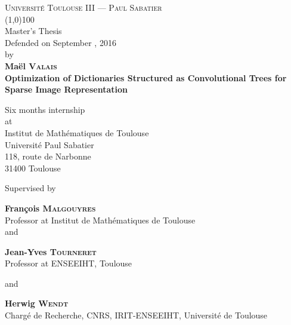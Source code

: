 \begin{titlepage}
\thispagestyle{titlepage}
\begin{center}
\textsc{Université Toulouse III — Paul Sabatier}\\
\vspace{0.5 cm}
\line(1,0){100}\\
\vspace{0.6 cm}
{{{Master's Thesis}}}\\
\vspace{0.3cm}
Defended on September , 2016\\ \vspace{0.3 cm} by\\ \vspace{0.3 cm} \textbf{Maël \textsc{Valais}}\\
\vfill
{\Huge \textbf{
Optimization of Dictionaries Structured as Convolutional Trees for Sparse Image Representation
}}\\
\vfill

Six months internship\\
\vspace{0.2 cm}
at\\
\vspace{0.2 cm}
{Institut de Mathématiques de Toulouse}\\
{Université Paul Sabatier}\\
{118, route de Narbonne}\\
{31400 Toulouse}\\

\vspace{2 cm}

\par Supervised by
\vspace{0.5cm}
\par \textbf{François \textsc{Malgouyres}}\\
Professor at Institut de Mathématiques de Toulouse\\ 

\vspace{0.2cm} and \vspace{0.2cm}

\textbf{Jean-Yves \textsc{Tourneret}}\\
Professor at ENSEEIHT, Toulouse

\vspace{0.2cm} and \vspace{0.2cm}

\textbf{Herwig \textsc{Wendt}}\\
Chargé de Recherche, CNRS, IRIT-ENSEEIHT, Université de Toulouse

\vspace{1.5cm}
\end{center}
\end{titlepage}